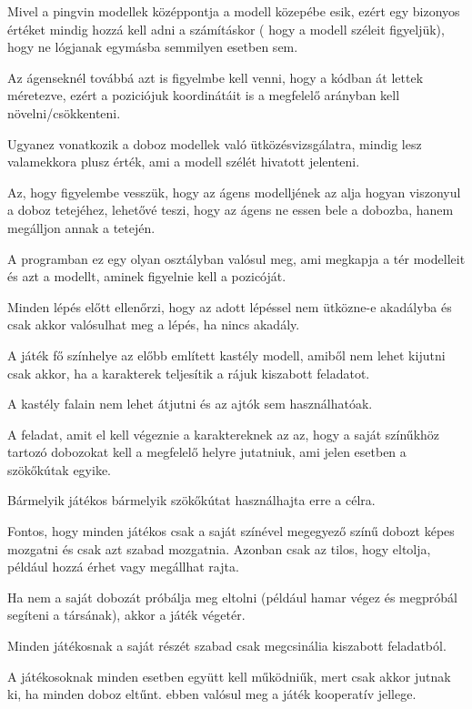 Mivel a pingvin modellek középpontja a modell közepébe esik, ezért egy bizonyos értéket mindig hozzá kell adni a számításkor ( hogy a modell széleit figyeljük), hogy ne lógjanak egymásba semmilyen esetben sem. 

Az ágenseknél továbbá azt is figyelmbe kell venni, hogy a kódban át lettek méretezve, ezért a poziciójuk koordinátáit is a megfelelő arányban kell növelni/csökkenteni.

Ugyanez vonatkozik a doboz modellek való ütközésvizsgálatra, mindig lesz valamekkora plusz érték, ami a modell szélét hivatott jelenteni.

Az, hogy figyelembe vesszük, hogy az ágens modelljének az alja hogyan viszonyul a doboz tetejéhez, lehetővé teszi, hogy az ágens ne essen bele a dobozba, hanem megálljon annak a tetején.

A programban ez egy olyan osztályban valósul meg, ami megkapja a tér modelleit és azt a modellt, aminek figyelnie kell a pozicóját.
 
Minden lépés előtt ellenőrzi, hogy az adott lépéssel nem ütközne-e akadályba és csak akkor valósulhat meg a lépés, ha nincs akadály.



A játék fő színhelye az előbb említett kastély modell, amiből nem lehet kijutni csak akkor, ha a karakterek teljesítik a rájuk kiszabott feladatot.

A kastély falain nem lehet átjutni és az ajtók sem használhatóak.

A feladat, amit el kell végeznie a karaktereknek az az, hogy a saját színűkhöz tartozó dobozokat kell a megfelelő helyre jutatniuk, ami jelen esetben a szökőkútak egyike. 

Bármelyik játékos bármelyik szökőkútat használhajta erre a célra.

Fontos, hogy minden játékos csak a saját színével megegyező színű dobozt képes mozgatni és csak azt szabad mozgatnia. Azonban csak az tilos, hogy eltolja, például hozzá érhet vagy megállhat rajta. 

Ha nem a saját dobozát próbálja meg eltolni (például hamar végez és megpróbál segíteni a társának), akkor a játék végetér.

Minden játékosnak a saját részét szabad csak megcsinália  kiszabott feladatból. 

A játékosoknak minden esetben együtt kell működniűk, mert csak akkor jutnak ki, ha minden doboz eltűnt. ebben valósul meg a játék kooperatív jellege. 

